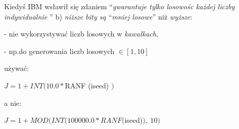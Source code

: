     \begin{frame}
	Kiedyś IBM wsławił się zdaniem ``{\it gwarantuje tylko losowośc każdej liczby indywidualnie }''
    \newline
    \newline
	b) {\it niższe bity są} ``{\it mniej losowe}'' niż {\it wyższe}:

    - nie wykorzystywać liczb losowych w {\it kawałkach},

	- np.do generowania liczb losowych $\in[1, 10 ]$

	używać:

	$J=1+INT(10.0*$RANF (iseed) $)$

	a nie:

	$J=1+MOD(INT(100000.0*RANF($iseed)$),\ 10)$
    \end{frame}
